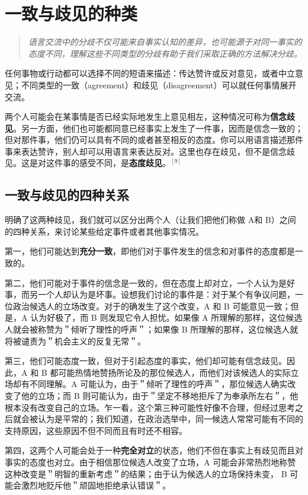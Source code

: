 \section{一致与歧见的种类}

\begin{quotation}
\textit{语言交流中的分歧不仅可能来自事实认知的差异，也可能源于对同一事实的态度不同，理解这些不同类型的分歧有助于我们采取正确的方法解决分歧。}
\end{quotation}

任何事物或行动都可以选择不同的短语来描述：传达赞许或反对意见，或者中立意见；不同类型的一致（agreement）和歧见（disagreement）可以就任何事情展开交流。

两个人可能会在某事情是否已经实际地发生上意见相左，这种情况可称为\textbf{信念歧见}。另一方面，他们也可能都同意已经事实上发生了一件事，因而是信念一致的；但对那件事，他们仍可以具有不同的或者甚至相反的态度。你可以用语言描述那件事来表达赞许，别人却可以用语言来表达反对。这里也存在歧见，但不是信念歧见。这是对这件事的感受不同，是\textbf{态度歧见}。$^{[9]}$

\subsection{一致与歧见的四种关系}

明确了这两种歧见，我们就可以区分出两个人（让我们把他们称做 A和 B）之间的四种关系，来讨论某些给定事件或者其他事实情况。

第一，他们可能达到\textbf{充分一致}，即他们对于事件发生的信念和对事件的态度都是一致的。

第二，他们可能对于事件的信念是一致的，但在态度上却对立，一个人认为是好事，而另一个人却认为是坏事。设想我们讨论的事件是：对于某个有争议问题，一位政治候选人的立场改变。对于的确发生了这个改变，A 和 B 可能意见一致；但是，A 认为好极了，而 B 则发现它令人担忧。如果像 A 所理解的那样，这位候选人就会被称赞为＂倾听了理性的呼声＂；如果像 B 所理解的那样，这位候选人就将被谴责为＂机会主义的反复无常＂。

第三，他们可能态度一致，但对于引起态度的事实，他们却可能有信念歧见。因此，A 和 B 都可能热情地赞扬所论及的那位候选人，而他们对该候选人的实际立场却有不同理解。A 可能认为，由于＂倾听了理性的呼声＂，那位候选人确实改变了他的立场；而 B 则可能认为，由于＂坚定不移地拒斥了为奉承所左右＂，他根本没有改变自己的立场。乍一看，这个第三种可能性好像不合理，但经过思考之后就会被认为是平常的；我们知道，在政治选举中，同一候选人常常可能有不同的支持原因，这些原因不但不同而且有时还不相容。

第四，这两个人可能会处于一种\textbf{完全对立}的状态，他们不但在事实上有歧见而且对事实的态度也对立。由于相信那位候选人改变了立场，A 可能会非常热烈地称赞这种改变是＂明智的重新考虑＂的结果；由于认为候选人的立场保持未变， B 可能会激烈地贬斥他＂顽固地拒绝承认错误＂。

